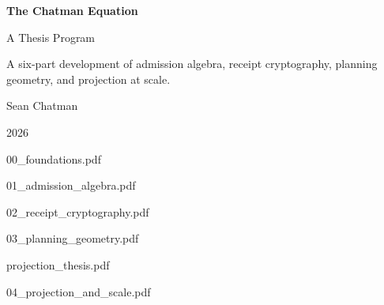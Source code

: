 \documentclass[11pt]{article}
\begin{document}
\begin{titlepage}
  \centering
  \vspace*{4cm}
  {\Huge\bfseries The Chatman Equation\par}
  \vspace{0.8cm}
  {\LARGE A Thesis Program\par}
  \vspace{2.5cm}
  {\large A six-part development of admission algebra, receipt
   cryptography, planning geometry, and projection at scale.\par}
  \vfill
  {\large Sean Chatman\par}
  \vspace{0.5cm}
  {\large 2026\par}
\end{titlepage}

\thispagestyle{empty}
\tableofcontents
\clearpage

%
  {00_foundations.pdf}

%
  {01_admission_algebra.pdf}

%
  {02_receipt_cryptography.pdf}

%
  {03_planning_geometry.pdf}

%
  {projection_thesis.pdf}

%
  {04_projection_and_scale.pdf}
\end{document}

